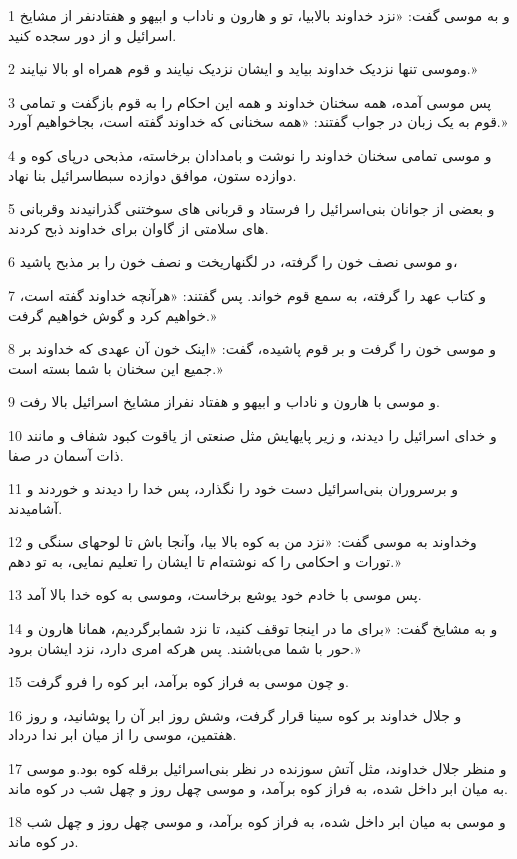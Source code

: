 \par 1 و به موسی گفت: «نزد خداوند بالابیا، تو و هارون و ناداب و ابیهو و هفتادنفر از مشایخ اسرائیل و از دور سجده کنید.
\par 2 وموسی تنها نزدیک خداوند بیاید و ایشان نزدیک نیایند و قوم همراه او بالا نیایند.»
\par 3 پس موسی آمده، همه سخنان خداوند و همه این احکام را به قوم باز‌گفت و تمامی قوم به یک زبان در جواب گفتند: «همه سخنانی که خداوند گفته است، بجاخواهیم آورد.»
\par 4 و موسی تمامی سخنان خداوند را نوشت و بامدادان برخاسته، مذبحی درپای کوه و دوازده ستون، موافق دوازده سبطاسرائیل بنا نهاد.
\par 5 و بعضی از جوانان بنی‌اسرائیل را فرستاد و قربانی های سوختنی گذرانیدند وقربانی های سلامتی از گاوان برای خداوند ذبح کردند.
\par 6 و موسی نصف خون را گرفته، در لگنهاریخت و نصف خون را بر مذبح پاشید،
\par 7 و کتاب عهد را گرفته، به سمع قوم خواند. پس گفتند: «هرآنچه خداوند گفته است، خواهیم کرد و گوش خواهیم گرفت.»
\par 8 و موسی خون را گرفت و بر قوم پاشیده، گفت: «اینک خون آن عهدی که خداوند بر جمیع این سخنان با شما بسته است.»
\par 9 و موسی با هارون و ناداب و ابیهو و هفتاد نفراز مشایخ اسرائیل بالا رفت.
\par 10 و خدای اسرائیل را دیدند، و زیر پایهایش مثل صنعتی از یاقوت کبود شفاف و مانند ذات آسمان در صفا.
\par 11 و برسروران بنی‌اسرائیل دست خود را نگذارد، پس خدا را دیدند و خوردند و آشامیدند.
\par 12 وخداوند به موسی گفت: «نزد من به کوه بالا بیا، وآنجا باش تا لوحهای سنگی و تورات و احکامی را که نوشته‌ام تا ایشان را تعلیم نمایی، به تو دهم.»
\par 13 پس موسی با خادم خود یوشع برخاست، وموسی به کوه خدا بالا آمد.
\par 14 و به مشایخ گفت: «برای ما در اینجا توقف کنید، تا نزد شمابرگردیم، همانا هارون و حور با شما می‌باشند. پس هر‌که امری دارد، نزد ایشان برود.»
\par 15 و چون موسی به فراز کوه برآمد، ابر کوه را فرو گرفت.
\par 16 و جلال خداوند بر کوه سینا قرار گرفت، وشش روز ابر آن را پوشانید، و روز هفتمین، موسی را از میان ابر ندا درداد.
\par 17 و منظر جلال خداوند، مثل آتش سوزنده در نظر بنی‌اسرائیل برقله کوه بود.و موسی به میان ابر داخل شده، به فراز کوه برآمد، و موسی چهل روز و چهل شب در کوه ماند.
\par 18 و موسی به میان ابر داخل شده، به فراز کوه برآمد، و موسی چهل روز و چهل شب در کوه ماند.
 
